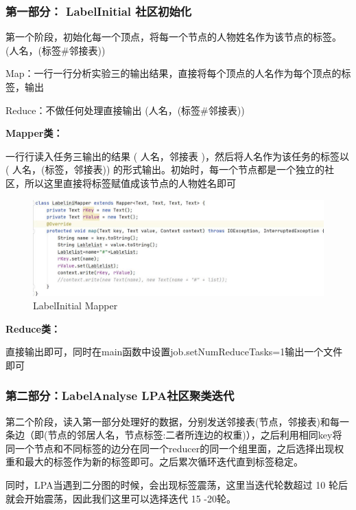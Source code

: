\documentclass[a4paper,UTF8]{article}
\numberwithin{equation}{section}
\begin{document}
\subsubsection{第一部分： LabelInitial 社区初始化}
第一个阶段，初始化每一个顶点，将每一个节点的人物姓名作为该节点的标签。(人名，(标签\#邻接表))\par
Map：一行一行分析实验三的输出结果，直接将每个顶点的人名作为每个顶点的标签，输出  \par
Reduce：不做任何处理直接输出 (人名，(标签\#邻接表))\par
\textbf{Mapper类：}\par
一行行读入任务三输出的结果 ( 人名，邻接表 )，然后将人名作为该任务的标签以 ( 人名，(标签，邻接表)) 的形式输出。初始时，每一个节点都是一个独立的社区，所以这里直接将标签赋值成该节点的人物姓名即可\\
\begin{figure}[H]
    \centering

    \includegraphics[width = 15cm]{5-1mapper.jpg}

    \caption{LabelInitial Mapper}
\end{figure}

\textbf{Reduce类：}\par
直接输出即可，同时在main函数中设置job.setNumReduceTasks=1输出一个文件即可\\

\subsubsection{第二部分：LabelAnalyse LPA社区聚类迭代}
第二个阶段，读入第一部分处理好的数据，分别发送邻接表(节点，邻接表)和每一条边（即(节点的邻居人名，节点标签:二者所连边的权重)），之后利用相同key将同一个节点和不同标签的边分在同一个reducer的同一个组里面，之后选择出现权重和最大的标签作为新的标签即可。之后累次循环迭代直到标签稳定。\par
同时，LPA当遇到二分图的时候，会出现标签震荡，这里当迭代轮数超过 10 轮后就会开始震荡，因此我们这里可以选择迭代 15 -20轮。\par
\end{document}
